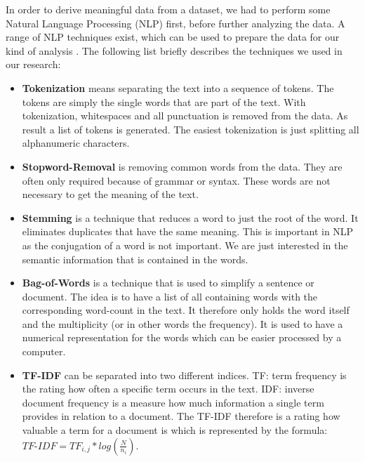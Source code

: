 In order to derive meaningful data from a dataset, we had to perform some Natural Language Processing (NLP) first, before further analyzing the data. A range of NLP techniques exist, which can be used to prepare the data for our kind of analysis \cite{solangi_review_2018}\cite{ferrari_natural_2018}. The following list briefly describes the techniques we used in our research:

\begin{itemize}
	\item \textbf{Tokenization} means separating the text into a sequence of tokens. The tokens are simply the single words that are part of the text. With tokenization, whitespaces and all punctuation is removed from the data. As result a list of tokens is generated. The easiest tokenization is just splitting all alphanumeric characters. \cite{solangi_review_2018}
	\item \textbf{Stopword-Removal} is removing common words from the data. They are often only required because of grammar or syntax. These words are not necessary to get the meaning of the text. \cite{mhatre_dimensionality_2017}
	\item \textbf{Stemming} is a technique that reduces a word to just the root of the word. It eliminates duplicates that have the same meaning. This is important in NLP as the conjugation of a word is not important. We are just interested in the semantic information that is contained in the words. \cite{mhatre_dimensionality_2017}
	\item \textbf{Bag-of-Words} is a technique that is used to simplify a sentence or document. The idea is to have a list of all containing words with the corresponding word-count in the text. It therefore only holds the word itself and the multiplicity (or in other words the frequency). It is used to have a numerical representation for the words which can be easier processed by a computer. \cite{mikolov_efficient_2013}
	\item \textbf{TF-IDF} can be separated into two different indices. TF: term frequency is the rating how often a specific term occurs in the text. IDF: inverse document frequency is a measure how much information a single term provides in relation to a document. \cite{leskovec_data_2014} The TF-IDF therefore is a rating how valuable a term for a document is which is represented by the formula: ${TF\text{-}IDF}=TF_{i,j} * log(\frac{N}{n_{i}})$.
\end{itemize}
